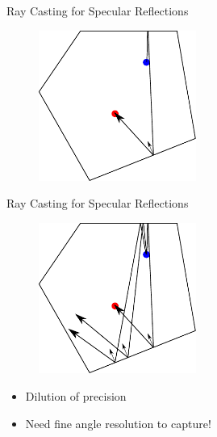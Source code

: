 \documentclass{beamer}
\begin{document}
\begin{frame}{Ray Casting for Specular Reflections}

\begin{figure}[t]
	\centering
    \includegraphics[width=0.46\textwidth]{ImageSourcesMulti3.pdf}
\end{figure}

\end{frame}

\begin{frame}{Ray Casting for Specular Reflections}

\begin{figure}[t]
	\centering
    \includegraphics[width=0.46\textwidth]{ImageSourcesMulti.pdf}
\end{figure}

\begin{itemize}[label=$\vartriangleright$]
    \item Dilution of precision
    \item Need fine angle resolution to capture!
\end{itemize}

\end{frame}
\end{document}
